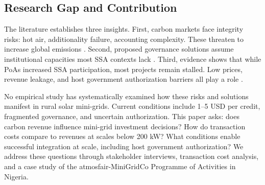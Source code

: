 \subsection{Research Gap and Contribution}
\label{sec:lit-gap}
The literature establishes three insights. First, carbon markets face integrity risks: hot air, additionality failure, accounting complexity. These threaten to increase global emissions \cite{schneider-integrity,theuer-transfers,siemons-accounting}. Second, proposed governance solutions assume institutional capacities most SSA contexts lack \cite{michaelowa-towards,michaelowa-catalysing}. Third, evidence shows that while PoAs increased SSA participation, most projects remain stalled. Low prices, revenue leakage, and host government authorization barriers all play a role \cite{michaelowa-mobilising,power-africa-credits,koko-disrupt}.

No empirical study has systematically examined how these risks and solutions manifest in rural solar mini-grids. Current conditions include 1–5 USD per credit, fragmented governance, and uncertain authorization. This paper asks: does carbon revenue influence mini-grid investment decisions? How do transaction costs compare to revenues at scales below 200 kW? What conditions enable successful integration at scale, including host government authorization? We address these questions through stakeholder interviews, transaction cost analysis, and a case study of the atmosfair-MiniGridCo Programme of Activities in Nigeria.